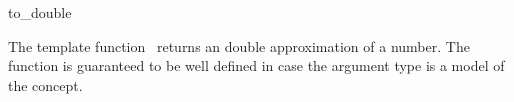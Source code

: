 \begin{ccRefFunction}{to_double}

\ccDefinition

The template function \ccRefName\ returns an double approximation of a number. 
The function is guaranteed to be well defined in case the argument type 
is a model of the  concept. 


{}

\ccSeeAlso

\\
\\

\end{ccRefFunction}
